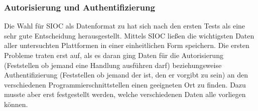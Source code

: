 

\subsubsection{Autorisierung und Authentifizierung} %
\label{ssub:authentication}

Die Wahl für SIOC als Datenformat zu hat sich nach den ersten Tests als eine sehr gute Entscheidung herausgestellt. Mittels SIOC ließen die wichtigsten Daten aller untersuchten Plattformen in einer einheitlichen Form speichern. Die ersten Probleme traten erst auf, als es daran ging Daten für die Autorisierung (Feststellen ob jemand eine Handlung ausführen darf) beziehungsweise Authentifizierung (Feststellen ob jemand der ist, den er vorgibt zu sein) an den verschiedenen Programmierschnittstellen einen geeigneten Ort zu finden. Dazu musste aber erst festgestellt werden, welche verschiedenen Daten alle vorliegen können.

\medskip

